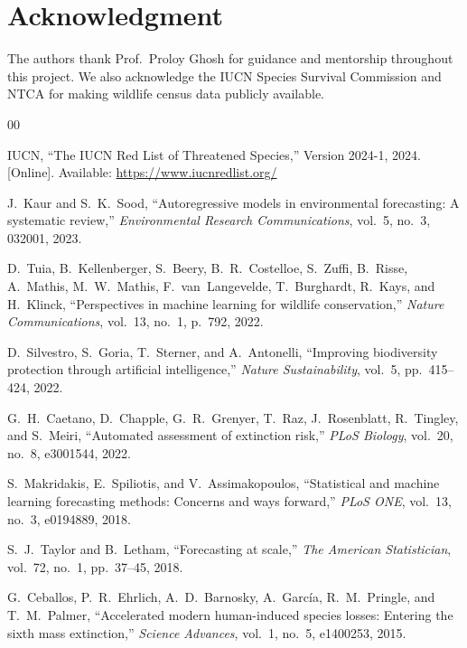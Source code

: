 \documentclass[conference]{IEEEtran}
\begin{document}
\section*{Acknowledgment}
The authors thank Prof.\ Proloy Ghosh for guidance and mentorship throughout this project. We also acknowledge the IUCN Species Survival Commission and NTCA for making wildlife census data publicly available.

\begin{thebibliography}{00}

IUCN, ``The IUCN Red List of Threatened Species,'' Version 2024-1, 2024. [Online]. Available: \url{https://www.iucnredlist.org/}

J.~Kaur and S.~K.~Sood, ``Autoregressive models in environmental forecasting: A systematic review,'' \textit{Environmental Research Communications}, vol.~5, no.~3, 032001, 2023.

D.~Tuia, B.~Kellenberger, S.~Beery, B.~R.~Costelloe, S.~Zuffi, B.~Risse, A.~Mathis, M.~W.~Mathis, F.~van~Langevelde, T.~Burghardt, R.~Kays, and H.~Klinck, ``Perspectives in machine learning for wildlife conservation,'' \textit{Nature Communications}, vol.~13, no.~1, p.~792, 2022.

D.~Silvestro, S.~Goria, T.~Sterner, and A.~Antonelli, ``Improving biodiversity protection through artificial intelligence,'' \textit{Nature Sustainability}, vol.~5, pp.~415--424, 2022.

G.~H.~Caetano, D.~Chapple, G.~R.~Grenyer, T.~Raz, J.~Rosenblatt, R.~Tingley, and S.~Meiri, ``Automated assessment of extinction risk,'' \textit{PLoS Biology}, vol.~20, no.~8, e3001544, 2022.

S.~Makridakis, E.~Spiliotis, and V.~Assimakopoulos, ``Statistical and machine learning forecasting methods: Concerns and ways forward,'' \textit{PLoS ONE}, vol.~13, no.~3, e0194889, 2018.

S.~J.~Taylor and B.~Letham, ``Forecasting at scale,'' \textit{The American Statistician}, vol.~72, no.~1, pp.~37--45, 2018.

G.~Ceballos, P.~R.~Ehrlich, A.~D.~Barnosky, A.~Garc\'{i}a, R.~M.~Pringle, and T.~M.~Palmer, ``Accelerated modern human-induced species losses: Entering the sixth mass extinction,'' \textit{Science Advances}, vol.~1, no.~5, e1400253, 2015.


\end{thebibliography}
\end{document}
